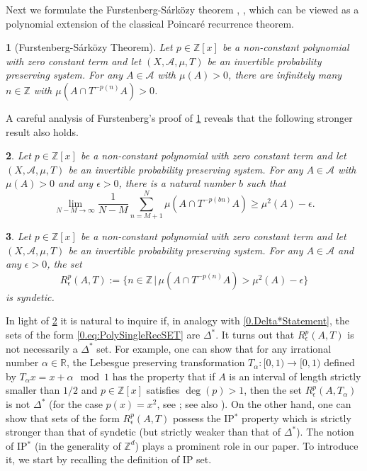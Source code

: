 \documentclass[11pt,american,preprint]{elsarticle}
\numberwithin{equation}{section}
\theoremstyle{plain}
\newtheorem{thm}{\protect\theoremname}[section]
\theoremstyle{plain*}
\theoremstyle{plain}
\theoremstyle{plain*}
\theoremstyle{plain}
\theoremstyle{plain*}
\theoremstyle{remark}
\theoremstyle{remark*}
\theoremstyle{remark}
\theoremstyle{remark*}
\theoremstyle{remark}
\theoremstyle{remark*}
\theoremstyle{plain}
\newtheorem{cor}[thm]{\protect\corollaryname}
\providecommand{\corollaryname}{Corollary}
\theoremstyle{definition}
\theoremstyle{plain}
\theoremstyle{plain} %
\providecommand{\theoremname}{Theorem}
\newcommand{\R}{\mathbb{R}}
\newcommand{\Z}{\mathbb{Z}}
\begin{document}
Next we formulate the Furstenberg-S{\'a}rk{\"o}zy theorem  \cite[Theorem 3.16]{Fbook}, \cite{sarkozy1978difference}, which can be viewed as a polynomial extension of the classical Poincar{\'e} recurrence theorem.
\begin{thm}[Furstenberg-S{\'a}rk{\"o}zy Theorem] \label{0.FSTheorem}
    Let $p\in\Z[x]$ be a non-constant polynomial with zero constant term and let $(X,\mathcal A,\mu,T)$ be an invertible probability preserving system. For any $A\in\mathcal A$ with $\mu(A)>0$, there are infinitely many $n\in\Z$ with $\mu(A\cap T^{-p(n)}A)>0$.
\end{thm}
A careful analysis of Furstenberg's proof of  \cref{0.FSTheorem} reveals that the following stronger result also holds.
\begin{thm}\label{0.FSThm.2}
     Let $p\in\Z[x]$ be a non-constant polynomial with zero constant term and let $(X,\mathcal A,\mu,T)$ be an invertible probability preserving system. For any $A\in\mathcal A$ with $\mu(A)>0$ and any $\epsilon>0$,  there is a natural number $b$ such that 
     \begin{equation}
         \lim_{N-M\rightarrow\infty}\frac{1}{N-M}\sum_{n=M+1}^N\mu(A\cap T^{-p(bn)}A)\geq \mu^2(A)-\epsilon.
     \end{equation}
\end{thm}
\begin{cor}\label{0.FSCorSyndetic}
    Let $p\in\Z[x]$ be a non-constant polynomial with zero constant term and let $(X,\mathcal A,\mu,T)$ be an invertible probability preserving system. For any $A\in\mathcal A$ and any $\epsilon>0$, the set
\begin{equation}\label{0.eq:PolySingleRecSET}
R_\epsilon^{p}(A,T):=\{n\in\Z\,|\,\mu(A\cap T^{-p(n)}A)>\mu^2(A)-\epsilon\}
\end{equation}
is syndetic.
\end{cor}
In light of \cref{0.FSThm.2} it is natural to inquire if, in analogy with \cref{0.Delta*Statement}, 
the sets of the form \eqref{0.eq:PolySingleRecSET}
are $\Delta^*$.
It turns out  that $R_\epsilon^p(A,T)$ is not necessarily a $\Delta^*$ set. For example, one can show that for any irrational number $\alpha\in\R$, the Lebesgue preserving transformation $T_\alpha:[0,1)\rightarrow [0,1)$ defined by $T_\alpha x=x+\alpha\mod 1$ has the property that if $A$ is an  interval of  length strictly smaller than $1/2$ and $p\in\Z[x]$ satisfies $\deg(p)>1$, then the set $R^p_\epsilon(A,T_\alpha)$ is not $\Delta^*$ (for the case $p(x)=x^2$, see \cite[p. 177]{Fbook}; see also \cite[Remark 5.4]{BerZel_JCTA_iteratedDifferences2021}). On the other hand, one can show  that sets of the form   $R_\epsilon^p(A,T)$ possess the IP$^*$ property which is  strictly stronger   than that of  syndetic (but strictly weaker than that of $\Delta^*$). The notion of IP$^*$ (in the generality of $\Z^d$) plays a prominent role in our paper. To introduce it,  we start by  recalling the definition  of IP set.\\
\end{document}
